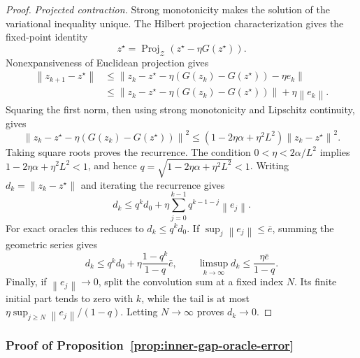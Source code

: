 \documentclass[11pt]{article}
\newcommand{\norm}[1]{\left\lVert #1\right\rVert}
\theoremstyle{plain}
\theoremstyle{definition}
\theoremstyle{remark}
\begin{document}
\begin{proof}
\emph{Projected contraction.}
Strong monotonicity makes the solution of the variational inequality unique.  The Hilbert
projection characterization \cite[Theorem~3.16]{BauschkeCombettes} gives the
fixed-point identity
\[
 z^\star=\operatorname{Proj}_{\mathcal Z}(z^\star-\eta G(z^\star)).
\]
Nonexpansiveness of Euclidean projection
\cite[Proposition~4.16]{BauschkeCombettes} gives
\begin{align*}
 \norm{z_{k+1}-z^\star}
 &\le\norm{z_k-z^\star-\eta(G(z_k)-G(z^\star))-\eta e_k}\\
 &\le\norm{z_k-z^\star-\eta(G(z_k)-G(z^\star))}+\eta\norm{e_k}.
\end{align*}
Squaring the first norm, then using strong monotonicity and Lipschitz continuity,
gives
\[
 \norm{z_k-z^\star-\eta(G(z_k)-G(z^\star))}^2
 \le(1-2\eta\alpha+\eta^2L^2)\norm{z_k-z^\star}^2.
\]
Taking square roots proves the recurrence.  The condition
$0<\eta<2\alpha/L^2$ implies $1-2\eta\alpha+\eta^2L^2<1$, and hence
$q=\sqrt{1-2\eta\alpha+\eta^2L^2}<1$.
Writing \(d_k=\norm{z_k-z^\star}\) and iterating the recurrence gives
\[
 d_k\le q^k d_0+
 \eta\sum_{j=0}^{k-1}q^{k-1-j}\norm{e_j}.
\]
For exact oracles this reduces to \(d_k\le q^kd_0\). If
\(\sup_j\norm{e_j}\le\bar e\), summing the geometric series gives
\[
 d_k\le q^kd_0+\eta\frac{1-q^k}{1-q}\bar e,
 \qquad
 \limsup_{k\to\infty}d_k\le\frac{\eta\bar e}{1-q}.
\]
Finally, if \(\norm{e_j}\to0\), split the convolution sum at a fixed index
\(N\). Its finite initial part tends to zero with \(k\), while the tail is at
most \(\eta\sup_{j\ge N}\norm{e_j}/(1-q)\). Letting \(N\to\infty\) proves
\(d_k\to0\).
\end{proof}

\subsubsection{Proof of Proposition~\ref{prop:inner-gap-oracle-error}}
\label{proof:11.4}
\end{document}
